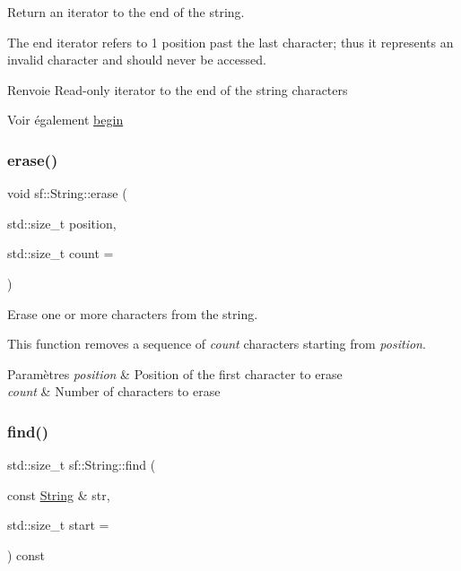 Return an iterator to the end of the string. 

The end iterator refers to 1 position past the last character; thus it represents an invalid character and should never be accessed.

\begin{DoxyReturn}{Renvoie}
Read-\/only iterator to the end of the string characters
\end{DoxyReturn}
\begin{DoxySeeAlso}{Voir également}
\hyperlink{classsf_1_1String_a8ec30ddc08e3a6bd11c99aed782f6dfe}{begin} 
\end{DoxySeeAlso}
\mbox{\label{classsf_1_1String_aaa78a0a46b3fbe200a4ccdedc326eb93}} 
\subsubsection{\texorpdfstring{erase()}{erase()}}
{\footnotesize\ttfamily void sf\+::\+String\+::erase (\begin{DoxyParamCaption}\item[{std\+::size\+\_\+t}]{position,  }\item[{std\+::size\+\_\+t}]{count = {} }\end{DoxyParamCaption})}



Erase one or more characters from the string. 

This function removes a sequence of {\itshape count} characters starting from {\itshape position}.


\begin{DoxyParams}{Paramètres}
{\em position} & Position of the first character to erase \\
\hline
{\em count} & Number of characters to erase \\
\hline
\end{DoxyParams}
\mbox{\label{classsf_1_1String_aa189ec8656854106ab8d2e935fd9cbcc}} 
\subsubsection{\texorpdfstring{find()}{find()}}
{\footnotesize\ttfamily std\+::size\+\_\+t sf\+::\+String\+::find (\begin{DoxyParamCaption}\item[{const \hyperlink{classsf_1_1String}{String} \&}]{str,  }\item[{std\+::size\+\_\+t}]{start = {} }\end{DoxyParamCaption}) const}



